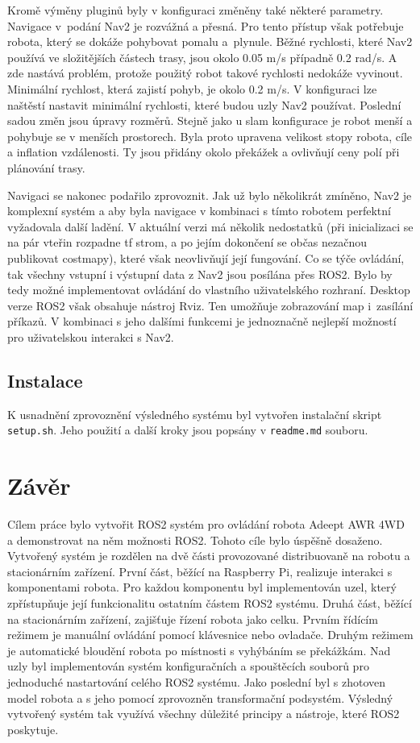Kromě výměny pluginů byly v konfiguraci změněny také některé parametry. Navigace v~podání Nav2 je rozvážná a přesná. Pro tento přístup však potřebuje robota, který se dokáže pohybovat pomalu a~plynule. Běžné rychlosti, které Nav2 používá ve složitějších částech trasy, jsou okolo 0.05 m/s případně 0.2 rad/s. A zde nastává problém, protože použitý robot takové rychlosti nedokáže vyvinout. Minimální rychlost, která zajistí pohyb, je okolo 0.2 m/s. V konfiguraci lze naštěstí nastavit minimální rychlosti, které budou uzly Nav2 používat. Poslední sadou změn jsou úpravy rozměrů. Stejně jako u slam konfigurace je robot menší a pohybuje se v menších prostorech. Byla proto upravena velikost stopy robota, cíle a inflation vzdálenosti. Ty jsou přidány okolo překážek a ovlivňují ceny polí při plánování trasy.

Navigaci se nakonec podařilo zprovoznit. Jak už bylo několikrát zmíněno, Nav2 je komplexní systém a aby byla navigace v kombinaci s tímto robotem perfektní vyžadovala další ladění. V aktuální verzi má několik nedostatků (při inicializaci se na pár vteřin rozpadne tf strom, a po jejím dokončení se občas nezačnou publikovat costmapy), které však neovlivňují její fungování. Co se týče ovládání, tak všechny vstupní i výstupní data z Nav2 jsou posílána přes ROS2. Bylo by tedy možné implementovat ovládání do vlastního uživatelského rozhraní. Desktop verze ROS2 však obsahuje nástroj Rviz. Ten umožňuje zobrazování map i~zasílání příkazů. V kombinaci s jeho dalšími funkcemi je jednoznačně nejlepší možností pro uživatelskou interakci s Nav2.

\section*{Instalace}
K usnadnění zprovoznění výsledného systému byl vytvořen instalační skript \verb|setup.sh|. Jeho použití a další kroky jsou popsány v \verb|readme.md| souboru.

\chapter{Závěr}
Cílem práce bylo vytvořit ROS2 systém pro ovládání robota Adeept AWR 4WD a demonstrovat na něm možnosti ROS2. Tohoto cíle bylo úspěšně dosaženo. Vytvořený systém je rozdělen na dvě části provozované distribuovaně na robotu a stacionárním zařízení. První část, běžící na Raspberry Pi, realizuje interakci s komponentami robota. Pro každou komponentu byl implementován uzel, který zpřístupňuje její funkcionalitu ostatním částem ROS2 systému. Druhá část, běžící na stacionárním zařízení, zajišťuje řízení robota jako celku. Prvním řídícím režimem je manuální ovládání pomocí klávesnice nebo ovladače. Druhým režimem je automatické bloudění robota po místnosti s vyhýbáním se překážkám. Nad uzly byl implementován systém konfiguračních a spouštěcích souborů pro jednoduché nastartování celého ROS2 systému. Jako poslední byl s zhotoven model robota a s jeho pomocí zprovozněn transformační podsystém. Výsledný vytvořený systém tak využívá všechny důležité principy a nástroje, které ROS2 poskytuje.

